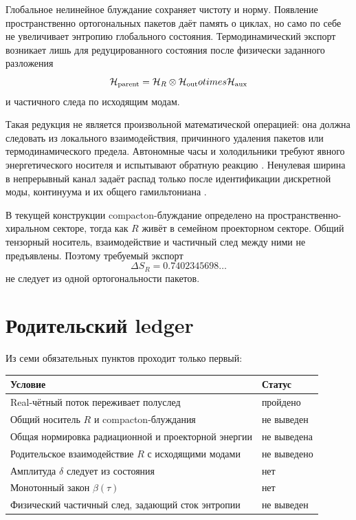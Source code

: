 Глобальное нелинейное блуждание сохраняет чистоту и норму. Появление
пространственно ортогональных пакетов даёт память о циклах, но само по себе
не увеличивает энтропию глобального состояния. Термодинамический экспорт
возникает лишь для редуцированного состояния после физически заданного
разложения
\begin{equation}
 \mathcal H_{\rm parent}
 =\mathcal H_R\otimes\mathcal H_{\rm out}otimes\mathcal H_{\rm aux}
\end{equation}
и частичного следа по исходящим модам.

Такая редукция не является произвольной математической операцией: она
должна следовать из локального взаимодействия, причинного удаления пакетов
или термодинамического предела. Автономные часы и холодильники требуют
явного энергетического носителя и испытывают обратную реакцию
\cite{real-pair-cooling-erker2017,real-pair-cooling-linden2010}.
Ненулевая ширина в непрерывный канал задаёт распад только после
идентификации дискретной моды, континуума и их общего гамильтониана
\cite{real-pair-cooling-fano1961}.

В текущей конструкции compacton-блуждание определено на пространственно-
хиральном секторе, тогда как $R$ живёт в семейном проекторном секторе.
Общий тензорный носитель, взаимодействие и частичный след между ними не
предъявлены. Поэтому требуемый экспорт
\begin{equation}
 \Delta S_R=0.7402345698\ldots
\end{equation}
не следует из одной ортогональности пакетов.

\section{Родительский ledger}

Из семи обязательных пунктов проходит только первый:
\begin{center}
\begin{tabular}{p{}p{}}
\toprule
Условие & Статус \\
\midrule
Real-чётный поток переживает полуслед & пройдено \\
Общий носитель $R$ и compacton-блуждания & не выведен \\
Общая нормировка радиационной и проекторной энергии & не выведена \\
Родительское взаимодействие $R$ с исходящими модами & не выведено \\
Амплитуда $\delta$ следует из состояния & нет \\
Монотонный закон $\beta(\tau)$ & нет \\
Физический частичный след, задающий сток энтропии & не выведен \\
\bottomrule
\end{tabular}
\end{center}

